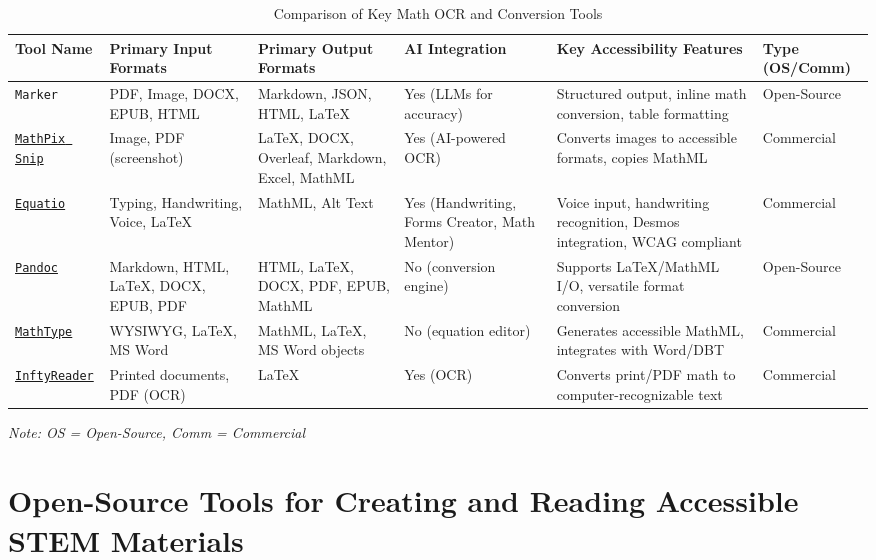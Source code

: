 \begin{table}[htbp]
    \centering
    \caption{Comparison of Key Math OCR and Conversion Tools}
    \label{tab:math_ocr_conversion_tools}
    \begin{tabular}{|p{2.5cm}|p{3cm}|p{3cm}|p{1.5cm}|p{3.5cm}|p{2cm}|}
        \hline
        \textbf{Tool Name} & \textbf{Primary Input Formats} & \textbf{Primary Output Formats} & \textbf{AI Integration} & \textbf{Key Accessibility Features} & \textbf{Type (OS/Comm)} \\
        \hline
        \texttt{Marker} & PDF, Image, DOCX, EPUB, HTML & Markdown, JSON, HTML, LaTeX & Yes (LLMs for accuracy) & Structured output, inline math conversion, table formatting & Open-Source \\
        \hline
        \href{https://mathpix.com/}{\texttt{MathPix Snip}} & Image, PDF (screenshot) & LaTeX, DOCX, Overleaf, Markdown, Excel, MathML & Yes (AI-powered OCR) & Converts images to accessible formats, copies MathML & Commercial \\
        \hline
        \href{https://www.texthelp.com/products/equatio/}{\texttt{Equatio}} & Typing, Handwriting, Voice, LaTeX & MathML, Alt Text & Yes (Handwriting, Forms Creator, Math Mentor) & Voice input, handwriting recognition, Desmos integration, WCAG compliant & Commercial \\
        \hline
        \href{https://pandoc.org/}{\texttt{Pandoc}} & Markdown, HTML, LaTeX, DOCX, EPUB, PDF & HTML, LaTeX, DOCX, PDF, EPUB, MathML & No (conversion engine) & Supports LaTeX/MathML I/O, versatile format conversion & Open-Source \\
        \hline
        \href{https://www.wiris.com/en/}{\texttt{MathType}} & WYSIWYG, LaTeX, MS Word & MathML, LaTeX, MS Word objects & No (equation editor) & Generates accessible MathML, integrates with Word/DBT & Commercial \\
        \hline
        \href{http://www.sciaccess.net/en/InftyReader/index.html}{\texttt{InftyReader}} & Printed documents, PDF (OCR) & LaTeX & Yes (OCR) & Converts print/PDF math to computer-recognizable text & Commercial \\
        \hline
    \end{tabular}
    \vspace{0.5em}
    \footnotesize{\textit{Note: OS = Open-Source, Comm = Commercial}}
\end{table}

\section{Open-Source Tools for Creating and Reading Accessible STEM Materials}\label{sec:open-source-stem-tools}

